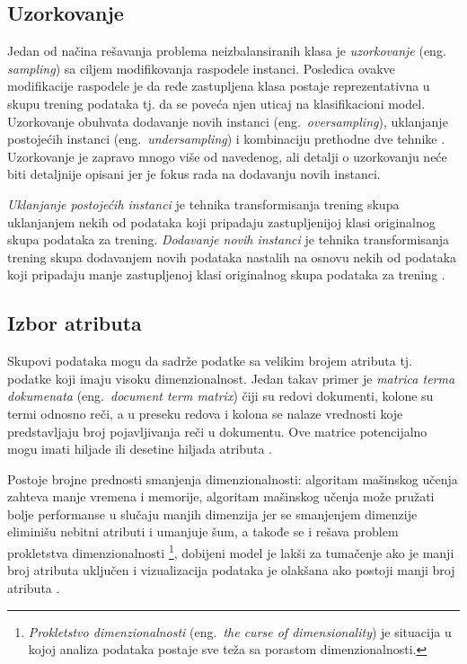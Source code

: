 \documentclass[12pt,oneside]{memoir}
\begin{document}
\subsection{Uzorkovanje}

Jedan od načina rešavanja problema neizbalansiranih klasa je \textit{uzorkovanje} (eng.~\\\textit{sampling}) sa ciljem modifikovanja raspodele instanci. Posledica ovakve modifikacije raspodele je da ređe zastupljena klasa postaje reprezentativna u skupu trening podataka tj. da se poveća njen uticaj na klasifikacioni model. Uzorkovanje obuhvata dodavanje novih instanci (eng.~\textit{oversampling}), uklanjanje postojećih instanci (eng.~\textit{undersampling}) i kombinaciju prethodne dve tehnike \cite{mitic, aggarwal}. Uzorkovanje je zapravo mnogo više od navedenog, ali detalji o uzorkovanju neće biti detaljnije opisani jer je fokus rada na dodavanju novih instanci.

\textit{Uklanjanje postojećih instanci} je tehnika transformisanja trening skupa uklanjanjem nekih od podataka koji pripadaju zastupljenijoj klasi originalnog skupa podataka za trening. \textit{Dodavanje novih instanci} je tehnika transformisanja trening skupa dodavanjem novih podataka nastalih na osnovu nekih od podataka koji pripadaju manje zastupljenoj klasi originalnog skupa podataka za trening \cite{mitic}. 

\subsection{Izbor atributa}

Skupovi podataka mogu da sadrže podatke sa velikim brojem atributa tj. podatke koji imaju visoku dimenzionalnost. Jedan takav primer je \textit{matrica terma dokumenata} (eng.~\textit{document term matrix}) čiji su redovi dokumenti, kolone su termi odnosno reči, a u preseku redova i kolona se nalaze vrednosti koje predstavljaju broj pojavljivanja reči u dokumentu. Ove matrice potencijalno mogu imati hiljade ili desetine hiljada atributa \cite{mitic}. 

Postoje brojne prednosti smanjenja dimenzionalnosti: algoritam mašinskog učenja zahteva manje vremena i memorije, algoritam mašinskog učenja može pružati bolje performanse u slučaju manjih dimenzija jer se smanjenjem dimenzije eliminišu nebitni atributi i umanjuje šum, a takođe se i rešava problem prokletstva dimenzionalnosti \footnote{\textit{Prokletstvo dimenzionalnosti} (eng.~\textit{the curse of dimensionality}) je situacija u kojoj analiza podataka postaje sve teža sa porastom dimenzionalnosti.}, dobijeni model je lakši za tumačenje ako je manji broj atributa uključen i vizualizacija podataka je olakšana ako postoji manji broj atributa \cite{mitic, UMLFTA}.
\end{document}
